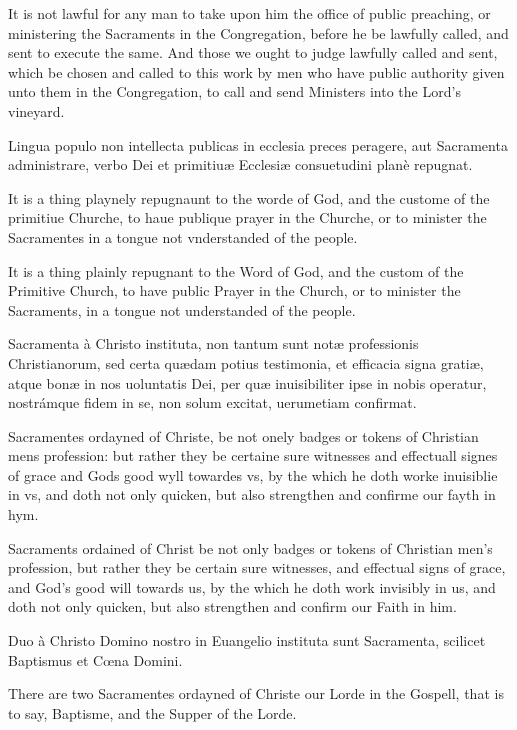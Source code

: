 It is not lawful for any man to take upon him the office of public preaching, or ministering the Sacraments in the Congregation, before he be lawfully called, and sent to execute the same. And those we ought to judge lawfully called and sent, which be chosen and called to this work by men who have public authority given unto them in the Congregation, to call and send Ministers into the Lord's vineyard.


Lingua populo non intellecta publicas in ecclesia preces peragere, aut Sacramenta administrare, verbo Dei et primitiuæ Ecclesiæ consuetudini planè repugnat.

It is a thing playnely repugnaunt to the worde of God, and the custome of the primitiue Churche, to haue publique prayer in the Churche, or to minister the Sacramentes in a tongue not vnderstanded of the people.

It is a thing plainly repugnant to the Word of God, and the custom of the Primitive Church, to have public Prayer in the Church, or to minister the Sacraments, in a tongue not understanded of the people.


Sacramenta à Christo instituta, non tantum sunt notæ professionis Christianorum, sed certa quædam potius testimonia, et efficacia signa gratiæ, atque bonæ in nos uoluntatis Dei, per quæ inuisibiliter ipse in nobis operatur, nostrámque fidem in se, non solum excitat, uerumetiam confirmat.

Sacramentes ordayned of Christe, be not onely badges or tokens of Christian mens profession: but rather they be certaine sure witnesses and effectuall signes of grace and Gods good wyll towardes vs, by the which he doth worke inuisiblie in vs, and doth not only quicken, but also strengthen and confirme our fayth in hym.

Sacraments ordained of Christ be not only badges or tokens of Christian men's profession, but rather they be certain sure witnesses, and effectual signs of grace, and God's good will towards us, by the which he doth work invisibly in us, and doth not only quicken, but also strengthen and confirm our Faith in him.

Duo à Christo Domino nostro in Euangelio instituta sunt Sacramenta, scilicet Baptismus et Cœna Domini.

There are two Sacramentes ordayned of Christe our Lorde in the Gospell, that is to say, Baptisme, and the Supper of the Lorde.


